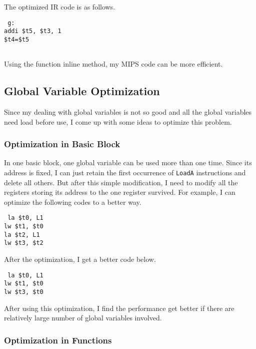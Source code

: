 \documentclass[journal]{IEEEtran}
\begin{document}
The optimized IR code is as follows.
\begin{center}
\texttt{
g:  \ \  \ \ \ \  \ \ \ \  \ \ \  \  \ \ \ \ \ \  \\
addi \$t5, \$t3, 1\\
\$t4=\$t5 \  \ \ \ \ \ \ \  \ \  \\\
}
\end{center}
 
Using the function inline method, my MIPS code can be more efficient.

\subsection{Global Variable Optimization}

Since my dealing with global variables is not so good and all the global variables need load before use, I come up with some ideas to optimize this problem.

\subsubsection{Optimization in Basic Block}

In one basic block, one global variable can be used more than one time. Since its address is fixed, I can just retain the first occurrence of \texttt{LoadA} instructions and delete all others. But after this simple modification, I need to modify all the registers storing its address to the one register survived. For example, I can optimize the following codes to a better way.
\begin{center}
\texttt{
la \$t0, L1 \ \ \ \\
lw \$t1, \$t0 \\
la \$t2, L1 \ \ \\
lw \$t3, \$t2 \\
}
\end{center}
After the optimization, I get a better code below.
\begin{center}
\texttt{
la \$t0, L1 \ \ \ \\
lw \$t1, \$t0 \\
lw \$t3, \$t0 \\
}
\end{center}

After using this optimization, I find the performance get better if there are relatively large number of global variables involved.

\subsubsection{Optimization in Functions}
\end{document}
